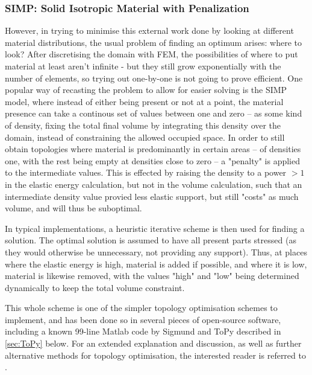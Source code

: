 \subsubsection{SIMP: Solid Isotropic Material with Penalization}
However, in trying to minimise this external work done by looking at different material distributions, the usual problem of finding an optimum arises: where to look? After discretising the domain with FEM, the possibilities of where to put material at least aren't infinite - but they still grow exponentially with the number of elements, so trying out one-by-one is not going to prove efficient. One popular way of recasting the problem to allow for easier solving is the SIMP model, where instead of either being present or not at a point, the material presence can take a continous set of values between one and zero -- as some kind of density, fixing the total final volume by integrating this density over the domain, instead of constraining the allowed occupied space. In order to still obtain topologies where material is predominantly in certain areas -- of densities one, with the rest being empty at densities close to zero -- a "penalty" is applied to the intermediate values. This is effected by raising the density to a power $> 1$ in the elastic energy calculation, but not in the volume calculation, such that an intermediate density value provied less elastic support, but still "costs" as much volume, and will thus be suboptimal. 

In typical implementations, a heuristic iterative scheme is then used for finding a solution. The optimal solution is assumed to have all present parts stressed (as they would otherwise be unnecessary, not providing any support). Thus, at places where the elastic energy is high, material is added if possible, and where it is low, material is likewise removed, with the values "high" and "low" being determined dynamically to keep the total volume constraint. 

This whole scheme is one of the simpler topology optimisation schemes to implement, and has been done so in several pieces of open-source software, including a known 99-line Matlab code by Sigmund \cite{sigmund200199} and ToPy described in \autoref{sec:ToPy} below. For an extended explanation and discussion, as well as further alternative methods for topology optimisation, the interested reader is referred to \citep{bendsoe2003topology}.




